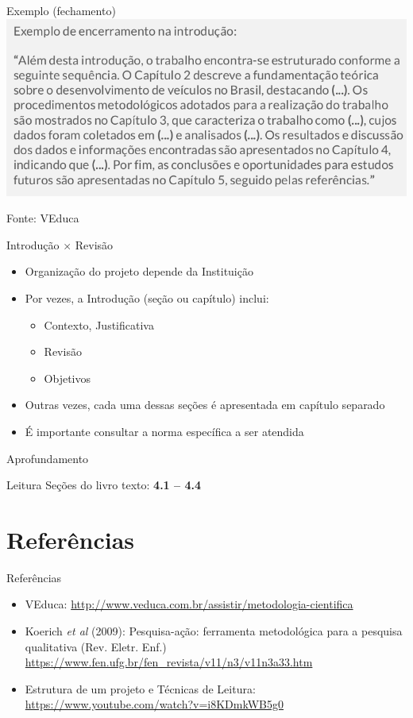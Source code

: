 \documentclass{beamer}
\begin{document}
\begin{frame}{Exemplo (fechamento)}
  \includegraphics[width=\textwidth]{ProjetoI/exemplo-introducao}

  Fonte: VEduca
\end{frame}

\begin{frame}{Introdução $\times$ Revisão}
  \begin{itemize}
  \item Organização do projeto depende da Instituição
  \item Por vezes, a Introdução (seção ou capítulo) inclui:
    \begin{itemize}
    \item<2-> Contexto, Justificativa
    \item<2-> Revisão
    \item<2-> Objetivos
    \end{itemize}
  \item Outras vezes, cada uma dessas seções é apresentada em capítulo
    separado
  \item É importante \alert{consultar} a norma \alert{específica} a
    ser atendida
  \end{itemize}
\end{frame}

\begin{frame}{Aprofundamento}
  \begin{block}{Leitura}
    Seções do livro texto: {\bf 4.1 -- 4.4}
  \end{block}
\end{frame}

\section{Referências}

\begin{frame}{Referências}
  \begin{itemize}
  \item<1-> VEduca:
    \url{http://www.veduca.com.br/assistir/metodologia-cientifica}
  \item<1-> Koerich {\em et al} (2009): Pesquisa-ação: ferramenta
    metodológica para a pesquisa qualitativa (Rev. Eletr. Enf.)
    \url{https://www.fen.ufg.br/fen_revista/v11/n3/v11n3a33.htm}
  \item<1-> Estrutura de um projeto e Técnicas de Leitura:
    \url{https://www.youtube.com/watch?v=i8KDmkWB5g0}
  \end{itemize}
\end{frame}
\end{document}
